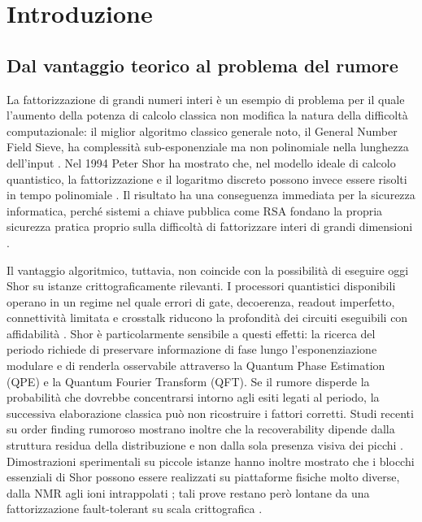 \chapter{Introduzione}
\label{chap:introduzione}


\section{Dal vantaggio teorico al problema del rumore}\label{sec:finale_1_1}

La fattorizzazione di grandi numeri interi è un esempio di problema per il quale l'aumento della potenza di calcolo classica non modifica la natura della difficoltà computazionale: il miglior algoritmo classico generale noto, il General Number Field Sieve, ha complessità sub-esponenziale ma non polinomiale nella lunghezza dell'input \cite{buhler1993gnfs,rsa250_2020}. Nel 1994 Peter Shor ha mostrato che, nel modello ideale di calcolo quantistico, la fattorizzazione e il logaritmo discreto possono invece essere risolti in tempo polinomiale \cite{shor1994}. Il risultato ha una conseguenza immediata per la sicurezza informatica, perché sistemi a chiave pubblica come RSA fondano la propria sicurezza pratica proprio sulla difficoltà di fattorizzare interi di grandi dimensioni \cite{rsa1978}.

Il vantaggio algoritmico, tuttavia, non coincide con la possibilità di eseguire oggi Shor su istanze crittograficamente rilevanti. I processori quantistici disponibili operano in un regime nel quale errori di gate, decoerenza, readout imperfetto, connettività limitata e crosstalk riducono la profondità dei circuiti eseguibili con affidabilità \cite{preskill2018}. Shor è particolarmente sensibile a questi effetti: la ricerca del periodo richiede di preservare informazione di fase lungo l'esponenziazione modulare e di renderla osservabile attraverso la Quantum Phase Estimation (QPE) e la Quantum Fourier Transform (QFT). Se il rumore disperde la probabilità che dovrebbe concentrarsi intorno agli esiti legati al periodo, la successiva elaborazione classica può non ricostruire i fattori corretti. Studi recenti su order finding rumoroso mostrano inoltre che la recoverability dipende dalla struttura residua della distribuzione e non dalla sola presenza visiva dei picchi \cite{skosana2021,yang2026,smolin2013}. Dimostrazioni sperimentali su piccole istanze hanno inoltre mostrato che i blocchi essenziali di Shor possono essere realizzati su piattaforme fisiche molto diverse, dalla NMR agli ioni intrappolati \cite{vandersypen2001,monz2016}; tali prove restano però lontane da una fattorizzazione fault-tolerant su scala crittografica \cite{smolin2013,gidney2021}.

